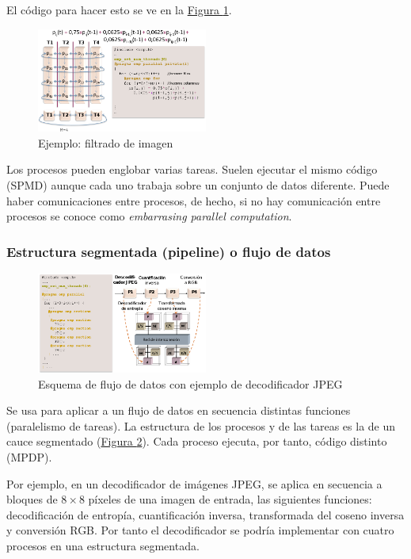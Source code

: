 \documentclass[10pt,a4paper,spanish]{report}
\begin{document}
El código para hacer esto se ve en la \hyperref[filtrado_de_imagen]{Figura \ref*{filtrado_de_imagen}}.

\begin{figure}[!h]
    \centering
    \includegraphics[width=0.5\textwidth]{38}
    \caption{Ejemplo: filtrado de imagen}
    \label{filtrado_de_imagen}
\end{figure}

Los procesos pueden englobar varias tareas. Suelen ejecutar el mismo código (SPMD) aunque cada uno trabaja sobre un conjunto de datos diferente. Puede haber comunicaciones entre procesos, de hecho, si no hay comunicación entre procesos se conoce como \textit{\textcolor[rgb]{0.2,0.4,0.8}{embarrasing parallel computation}}.

\textcolor[rgb]{0.2,0.4,0.8}{\subsubsection{Estructura segmentada (pipeline) o flujo de datos}}
\begin{figure}[!h]
    \centering
    \includegraphics[width=0.5\textwidth]{39}
    \caption{Esquema de flujo de datos con ejemplo de decodificador JPEG}
    \label{flujo_datos}
\end{figure}

Se usa para aplicar a un flujo de datos en secuencia distintas funciones (paralelismo de tareas). La estructura de los procesos y de las tareas es la de un cauce segmentado (\hyperref[flujo_datos]{Figura \ref*{flujo_datos}}). Cada proceso ejecuta, por tanto, código distinto (MPDP). 

Por ejemplo, en un decodificador de imágenes JPEG, se aplica en secuencia a bloques de $8 \times 8$ píxeles de una imagen de entrada, las siguientes funciones: decodificación de entropía, cuantificación inversa, transformada del coseno inversa y conversión RGB. Por tanto el decodificador se podría implementar con cuatro procesos en una estructura segmentada.
\end{document}
